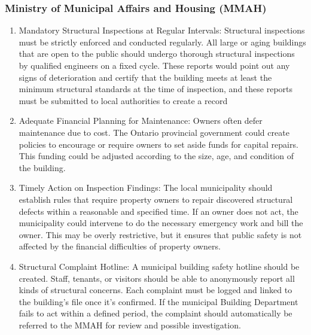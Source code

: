 \documentclass[12pt]{article}
\begin{document}
\subsubsection{Ministry of Municipal Affairs and Housing (MMAH)}
\begin{enumerate}
    \item Mandatory Structural Inspections at Regular Intervals: Structural inspections must be strictly enforced and conducted regularly. All large or aging buildings that are open to the public should undergo thorough structural inspections by qualified engineers on a fixed cycle. These reports would point out any signs of deterioration and certify that the building meets at least the minimum structural standards at the time of inspection, and these reports must be submitted to local authorities to create a record

    \item Adequate Financial Planning for Maintenance: Owners often defer maintenance due to cost. The Ontario provincial government could create policies to encourage or require owners to set aside funds for capital repairs. This funding could be adjusted according to the size, age, and condition of the building. 

    \item Timely Action on Inspection Findings: The local municipality should establish rules that require property owners to repair discovered structural defects within a reasonable and specified time. If an owner does not act, the municipality could intervene to do the necessary emergency work and bill the owner. This may be overly restrictive, but it ensures that public safety is not affected by the financial difficulties of property owners.
    
    \item Structural Complaint Hotline: A municipal building safety hotline should be created. Staff, tenants, or visitors should be able to anonymously report all kinds of structural concerns. Each complaint must be logged and linked to the building’s file once it's confirmed. If the municipal Building Department fails to act within a defined period, the complaint should automatically be referred to the MMAH for review and possible investigation.
\end{enumerate}
\end{document}

